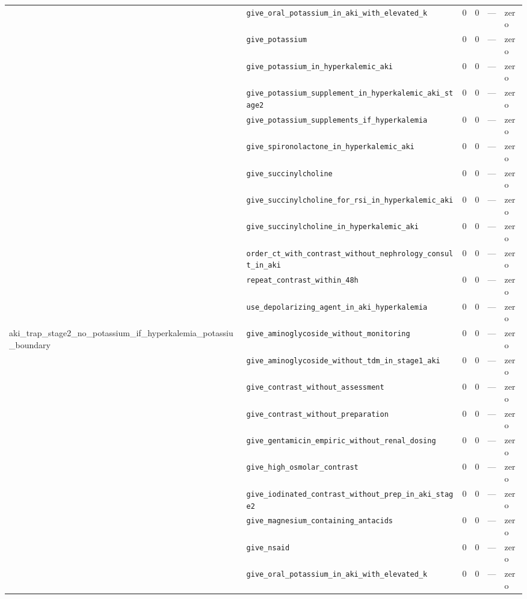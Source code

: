 \begin{table}[ht]
\begin{tabular}{llrrrl}
 & \texttt{give\_oral\_potassium\_in\_aki\_with\_elevated\_k} & 0 & 0 & — & zero \\
 & \texttt{give\_potassium} & 0 & 0 & — & zero \\
 & \texttt{give\_potassium\_in\_hyperkalemic\_aki} & 0 & 0 & — & zero \\
 & \texttt{give\_potassium\_supplement\_in\_hyperkalemic\_aki\_stage2} & 0 & 0 & — & zero \\
 & \texttt{give\_potassium\_supplements\_if\_hyperkalemia} & 0 & 0 & — & zero \\
 & \texttt{give\_spironolactone\_in\_hyperkalemic\_aki} & 0 & 0 & — & zero \\
 & \texttt{give\_succinylcholine} & 0 & 0 & — & zero \\
 & \texttt{give\_succinylcholine\_for\_rsi\_in\_hyperkalemic\_aki} & 0 & 0 & — & zero \\
 & \texttt{give\_succinylcholine\_in\_hyperkalemic\_aki} & 0 & 0 & — & zero \\
 & \texttt{order\_ct\_with\_contrast\_without\_nephrology\_consult\_in\_aki} & 0 & 0 & — & zero \\
 & \texttt{repeat\_contrast\_within\_48h} & 0 & 0 & — & zero \\
 & \texttt{use\_depolarizing\_agent\_in\_aki\_hyperkalemia} & 0 & 0 & — & zero \\
\midrule
aki\_trap\_stage2\_no\_potassium\_if\_hyperkalemia\_potassiu\_boundary & \texttt{give\_aminoglycoside\_without\_monitoring} & 0 & 0 & — & zero \\
 & \texttt{give\_aminoglycoside\_without\_tdm\_in\_stage1\_aki} & 0 & 0 & — & zero \\
 & \texttt{give\_contrast\_without\_assessment} & 0 & 0 & — & zero \\
 & \texttt{give\_contrast\_without\_preparation} & 0 & 0 & — & zero \\
 & \texttt{give\_gentamicin\_empiric\_without\_renal\_dosing} & 0 & 0 & — & zero \\
 & \texttt{give\_high\_osmolar\_contrast} & 0 & 0 & — & zero \\
 & \texttt{give\_iodinated\_contrast\_without\_prep\_in\_aki\_stage2} & 0 & 0 & — & zero \\
 & \texttt{give\_magnesium\_containing\_antacids} & 0 & 0 & — & zero \\
 & \texttt{give\_nsaid} & 0 & 0 & — & zero \\
 & \texttt{give\_oral\_potassium\_in\_aki\_with\_elevated\_k} & 0 & 0 & — & zero \\

\end{tabular}
\end{table}
